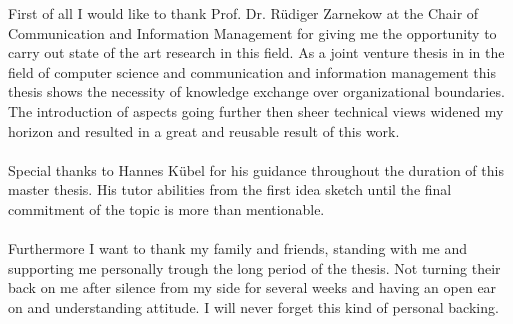 \thispagestyle{empty}
\vspace*{3cm}

\vspace*{1cm}
\noindent 
First of all I would like to thank Prof. Dr. Rüdiger Zarnekow at the Chair of Communication and Information Management for giving me the opportunity to carry out state of the art research in this field. As a joint venture thesis in in the field of computer science and communication and information management this thesis shows the necessity of knowledge exchange over organizational boundaries. The introduction of aspects going further then sheer technical views widened my horizon and resulted in a great and reusable result of this work. 
\\
\\
Special thanks to Hannes Kübel for his guidance throughout the duration of this master thesis. His tutor abilities from the first idea sketch until the final commitment of the topic is more than mentionable. 
\\
\\
Furthermore I want to thank my family and friends, standing with me and supporting me personally trough the long period of the thesis. Not turning their back on me after silence from my side for several weeks and having an open ear on and understanding attitude. I will never forget this kind of personal backing.